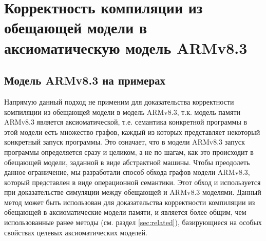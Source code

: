 \chapter{Корректность компиляции из обещающей модели в аксиоматическую модель ARMv8.3} \label{sec:armv83}

\section{Модель ARMv8.3 на примерах} \label{sec:armv83examples}
 Напрямую данный подход не применим для доказательства
корректности компиляции из обещающей модели в модель ARMv8.3, т.к.
модель памяти ARMv8.3 является аксиоматической, т.е. семантика конкретной программы в этой модели есть
множество графов, каждый из которых представляет некоторый конкретный запуск программы. Это означает, что
в модели ARMv8.3 запуск программы определяется сразу и целиком, а не по шагам, как это происходит в
обещающей модели, заданной в виде абстрактной машины.
Чтобы преодолеть данное ограничение, мы разработали способ обхода графов модели ARMv8.3,
который представлен в виде операционной семантики.
Этот обход и используется при доказательстве симуляции между обещающей и ARMv8.3 моделями.
Данный метод может быть использован для доказательства корректности компиляции из
обещающей в аксиоматические модели памяти, и является более общим, чем использованные ранее методы
(см. раздел \ref{sec:related}), базирующиеся на особых свойствах целевых аксиоматических моделей.

